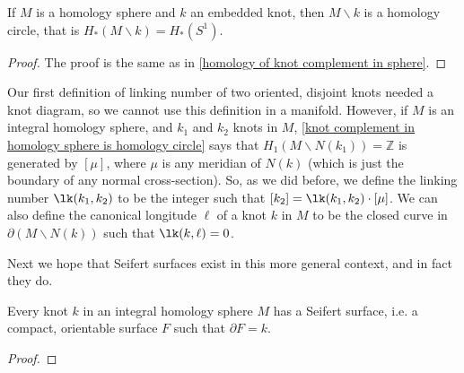 \begin{prop}
\label{knot complement in homology sphere is homology circle}
If $M$ is a homology sphere and $k$ an embedded knot, then $M\backslash k$ is a homology circle, that is $H_*(M\backslash k) = H_*(S^1)$.
\end{prop}
\begin{proof}
The proof is the same as in \cref{homology of knot complement in sphere}.
\end{proof}

Our first definition of linking number of two oriented, disjoint knots needed a knot diagram, so we cannot use this definition in a manifold. However, if $M$ is an integral homology sphere, and $k_1$ and $k_2$ knots in $M$, \cref{knot complement in homology sphere is homology circle} says that $H_1(M \backslash N(k_1)) = \mathbb Z$ is generated by $[\mu]$, where $\mu$ is any meridian of $N(k)$ (which is just the boundary of any normal cross-section). So, as we did before, we define the linking number $\lk(k_1,k_2)$ to be the integer such that $[k_2] = \lk(k_1,k_2) \cdot [\mu]$. We can also define the canonical longitude $\ell$ of a knot $k$ in $M$ to be the closed curve in $\partial(M \backslash N(k))$ such that $\lk(k,\ell)=0$. 

Next we hope that Seifert surfaces exist in this more general context, and in fact they do.
\begin{lem}
Every knot $k$ in an integral homology sphere $M$ has a Seifert surface, i.e. a compact, orientable surface $F$ such that $\partial F=k$.
\end{lem}
\begin{proof}

\end{proof}


